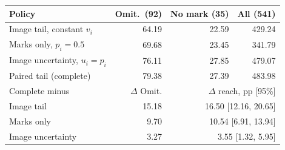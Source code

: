 \begin{tabular}{lrrr}
\toprule
Policy & Omit.\ (92) & No mark (35) & All (541) \\
\midrule
Image tail, constant $v_i$ & 64.19 & 22.59 & 429.24 \\
Marks only, $p_i=0.5$ & 69.68 & 23.45 & 341.79 \\
Image uncertainty, $u_i=p_i$ & 76.11 & 27.85 & 479.07 \\
Paired tail (complete) & 79.38 & 27.39 & 483.98 \\
\midrule
Complete minus & $\Delta$ Omit. & \multicolumn{2}{r}{$\Delta$ reach, pp [95\%]} \\
\midrule
Image tail & 15.18 & \multicolumn{2}{r}{16.50 [12.16, 20.65]} \\
Marks only & 9.70 & \multicolumn{2}{r}{10.54 [6.91, 13.94]} \\
Image uncertainty & 3.27 & \multicolumn{2}{r}{3.55 [1.32, 5.95]} \\
\bottomrule
\end{tabular}
